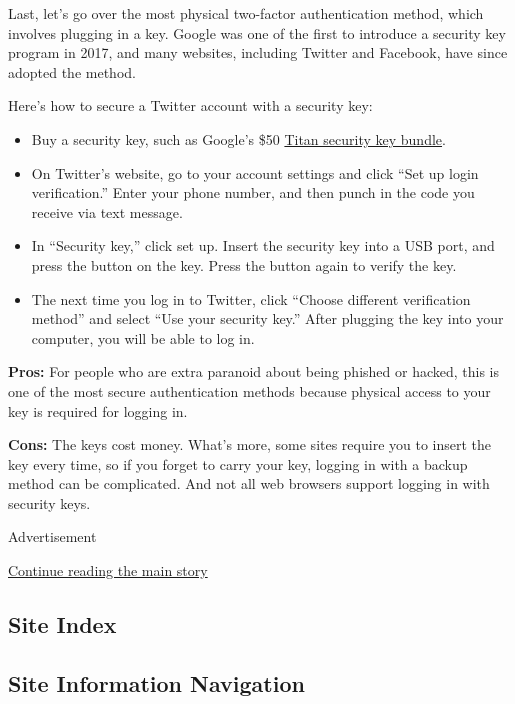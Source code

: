 Last, let's go over the most physical two-factor authentication method,
which involves plugging in a key. Google was one of the first to
introduce a security key program in 2017, and many websites, including
Twitter and Facebook, have since adopted the method.

Here's how to secure a Twitter account with a security key:

\begin{itemize}
\item
  Buy a security key, such as Google's \$50
  \href{https://store.google.com/product/titan_security_key_kit}{Titan
  security key bundle}.
\item
  On Twitter's website, go to your account settings and click ``Set up
  login verification.'' Enter your phone number, and then punch in the
  code you receive via text message.
\item
  In ``Security key,'' click set up. Insert the security key into a USB
  port, and press the button on the key. Press the button again to
  verify the key.
\item
  The next time you log in to Twitter, click ``Choose different
  verification method'' and select ``Use your security key.'' After
  plugging the key into your computer, you will be able to log in.
\end{itemize}

\textbf{Pros:} For people who are extra paranoid about being phished or
hacked, this is one of the most secure authentication methods because
physical access to your key is required for logging in.

\textbf{Cons:} The keys cost money. What's more, some sites require you
to insert the key every time, so if you forget to carry your key,
logging in with a backup method can be complicated. And not all web
browsers support logging in with security keys.

Advertisement

\protect\hyperlink{after-bottom}{Continue reading the main story}

\hypertarget{site-index}{%
\subsection{Site Index}\label{site-index}}

\hypertarget{site-information-navigation}{%
\subsection{Site Information
Navigation}\label{site-information-navigation}}

